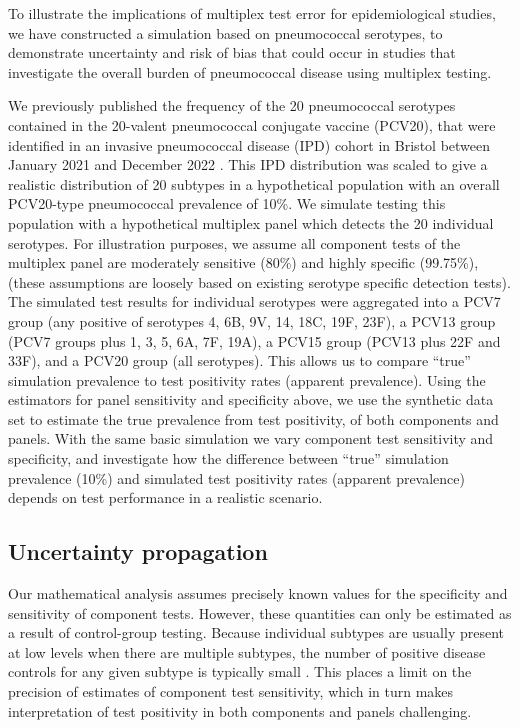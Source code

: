 \documentclass[10pt,letterpaper]{article}
\begin{document}
To illustrate the implications of multiplex test error for epidemiological studies, we have constructed a simulation based on pneumococcal serotypes, to demonstrate uncertainty and risk of bias that could occur in studies that investigate the overall burden of pneumococcal disease using multiplex testing. 

We previously published the frequency of the 20 pneumococcal serotypes contained in the 20-valent pneumococcal conjugate vaccine (PCV20), that were identified in an invasive pneumococcal disease (IPD) cohort in Bristol between January 2021 and December 2022 \cite{hyams2023a}. This IPD distribution was scaled to give a realistic distribution of 20 subtypes in a hypothetical population with an overall PCV20-type pneumococcal prevalence of 10\%. We simulate testing this population with a hypothetical multiplex panel which detects the 20 individual serotypes. For illustration purposes, we assume all component tests of the multiplex panel are moderately sensitive (80\%) and highly specific (99.75\%), (these assumptions are loosely based on existing serotype specific detection tests). The simulated test results for individual serotypes were aggregated into a PCV7 group (any positive of serotypes 4, 6B, 9V, 14, 18C, 19F, 23F), a PCV13 group (PCV7 groups plus 1, 3, 5, 6A, 7F, 19A), a PCV15 group (PCV13 plus 22F and 33F), and a PCV20 group (all serotypes). This allows us to compare ``true'' simulation prevalence to test positivity rates (apparent prevalence). Using the estimators for panel sensitivity and specificity above, we use the synthetic data set to estimate the true prevalence from test positivity, of both components and panels. With the same basic simulation we vary component test sensitivity and specificity, and investigate how the difference between ``true'' simulation prevalence (10\%) and simulated test positivity rates (apparent prevalence) depends on test performance in a realistic scenario. 

\subsection*{Uncertainty propagation}

Our mathematical analysis assumes precisely known values for the specificity and sensitivity of component tests. However, these quantities can only be estimated as a result of control-group testing. Because individual subtypes are usually present at low levels when there are multiple subtypes, the number of positive disease controls for any given subtype is typically small \cite{bonten2015}. This places a limit on the precision of estimates of component test sensitivity, which in turn makes interpretation of test positivity in both components and panels challenging.
\end{document}
